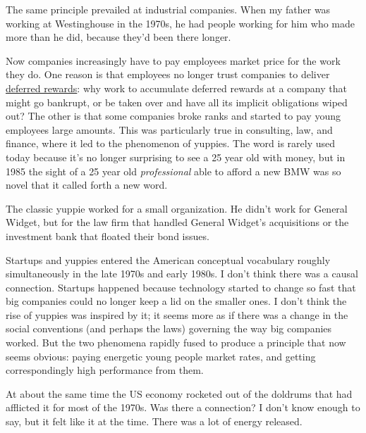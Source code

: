 The same principle
                  prevailed at industrial companies. When my father was working
                  at Westinghouse in the 1970s, he had people working for him
                  who made more than he did, because they'd been there
                  longer.

Now companies increasingly have to pay
                  employees market price for the work they do. One reason is
                  that employees no longer trust companies to deliver
                  \href{http://www.paulgraham.com/ladder.html}{deferred rewards}: why work to
                  accumulate deferred rewards at a company that might go
                  bankrupt, or be taken over and have all its implicit
                  obligations wiped out? The other is that some companies broke
                  ranks and started to pay young employees large amounts. This
                  was particularly true in consulting, law, and finance, where
                  it led to the phenomenon of yuppies. The word is rarely used
                  today because it's no longer surprising to see a 25 year old
                  with money, but in 1985 the sight of a 25 year old
                  \emph{professional} able to afford a new BMW was so novel that
                  it called forth a new word.

The classic yuppie
                  worked for a small organization. He didn't work for General
                  Widget, but for the law firm that handled General Widget's
                  acquisitions or the investment bank that floated their bond
                  issues.

Startups and yuppies entered the American
                  conceptual vocabulary roughly simultaneously in the late 1970s
                  and early 1980s. I don't think there was a causal connection.
                  Startups happened because technology started to change so fast
                  that big companies could no longer keep a lid on the smaller
                  ones. I don't think the rise of yuppies was inspired by it; it
                  seems more as if there was a change in the social conventions
                  (and perhaps the laws) governing the way big companies worked.
                  But the two phenomena rapidly fused to produce a principle
                  that now seems obvious: paying energetic young people market
                  rates, and getting correspondingly high performance from
                  them.

At about the same time the US economy
                  rocketed out of the doldrums that had afflicted it for most of
                  the 1970s. Was there a connection? I don't know enough to say,
                  but it felt like it at the time. There was a lot of energy
                  released.


